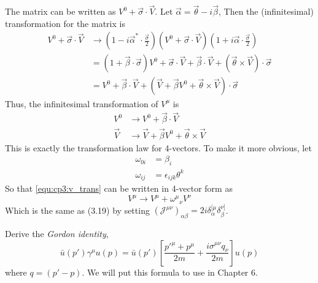 \begin{problembody}
    \item The matrix can be written as $V^0 + \vec{\sigma}\cdot\vec{V}$. Let $\vec{\alpha} = \vec{\theta} - i\vec{\beta}$,
    Then the (infinitesimal) transformation for the matrix is
    \begin{align*}
        V^0 + \vec{\sigma}\cdot\vec{V} & \to 
        \left(1 - i\vec{\alpha}^\ast\cdot\frac{\vec{\sigma}}{2}\right)
        \left(V^0 + \vec{\sigma}\cdot\vec{V}\right)
        \left(1 + i\vec{\alpha}\cdot\frac{\vec{\sigma}}{2}\right)\\
        & = \left(1 + \vec{\beta}\cdot\vec{\sigma}\right) V^0 + \vec{\sigma}\cdot\vec{V} + \vec{\beta}\cdot\vec{V} + \left(\vec{\theta}\times\vec{V}\right)\cdot\vec{\sigma}\\
        & = V^0 + \vec{\beta}\cdot\vec{V} + \left(\vec{V} + \vec{\beta}V^0 + \vec{\theta}\times\vec{V}\right)\cdot\vec{\sigma}
    \end{align*}
    Thus, the infinitesimal transformation of $V^\mu$ is
    \begin{subequations}\label{equ:cp3:v_trans}
        \begin{align}
            V^0 & \to V^0 + \vec{\beta}\cdot\vec{V}\\
            \vec{V} & \to \vec{V} + \vec{\beta}V^0 + \vec{\theta}\times\vec{V}
        \end{align}
    \end{subequations}
    This is exactly the transformation law for 4-vectors. To make it more obvious, let
    \begin{subequations}\label{equ:cp3:omega_def}
        \begin{align}
            \omega_{0i} & = \beta_i \\
            \omega_{ij} & = \epsilon_{ijk} \theta^k
        \end{align}
    \end{subequations}
    So that \eqref{equ:cp3:v_trans} can be written in 4-vector form as
    \begin{equation*}
        V^\mu \to V^\mu + \omega^\mu{}_\nu V^\nu
    \end{equation*}
    Which is the same as (3.19) by setting $(\mathcal{J}^{\mu\nu})_{\alpha\beta} = 2i \delta^{[\mu}_\alpha \delta^{\nu]}_\beta$.
\end{problembody}

\problem Derive the \textit{Gordon identity},
\begin{equation}\label{equ:cp3:gordon_identity}
    \bar{u}(p')\gamma^\mu u(p) = \bar{u}(p') \left[\frac{p'^{\mu} + p^\mu}{2m} + \frac{i\sigma^{\mu\nu}q_\nu}{2m}\right] u(p)
\end{equation}
where $q = (p' - p)$. We will put this formula to use in Chapter 6.

